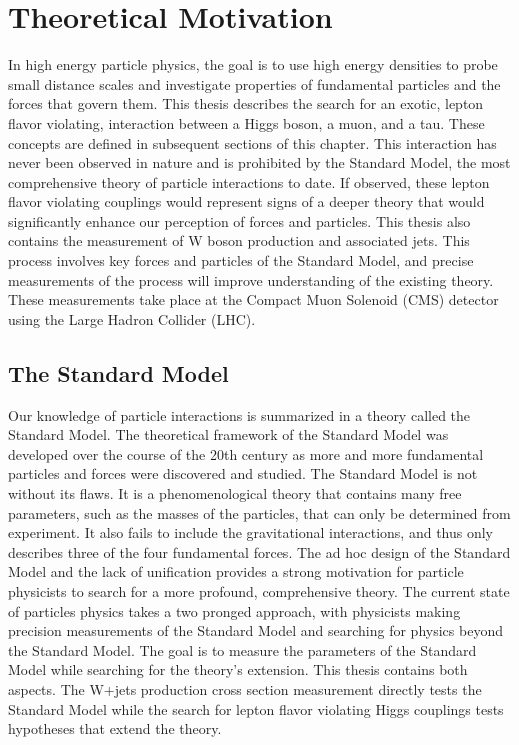 \documentclass[oneside, letterpaper, oldfontcommands]{memoir}
\begin{document}
\chapter{Theoretical Motivation}\label{theory}
\qquad In high energy particle physics, the goal is to use high energy densities to probe small distance scales and investigate properties of fundamental particles and the forces that govern them. This thesis describes the search for an exotic, lepton flavor violating, interaction between a Higgs boson, a muon, and a tau. These concepts are defined in subsequent sections of this chapter. This interaction has never been observed in nature and is prohibited by the Standard Model, the most comprehensive theory of particle interactions to date. If observed, these lepton flavor violating couplings would represent signs of a deeper theory that would significantly enhance our perception of forces and particles. This thesis also contains the measurement of W boson production and associated jets. This process involves key forces and particles of the Standard Model, and precise measurements of the process will improve understanding of the existing theory. These measurements take place at the Compact Muon Solenoid (CMS) detector using the Large Hadron Collider (LHC). 

\section{The Standard Model}\label{sm}

\qquad Our knowledge of particle interactions is summarized in a theory called the Standard Model. The theoretical framework of the Standard Model was developed over the course of the 20th century as more and more fundamental particles and forces were discovered and studied. The Standard Model is not without its flaws. It is a phenomenological theory that contains many free parameters, such as the masses of the particles, that can only be determined from experiment. It also fails to include the gravitational interactions, and thus only describes three of the four fundamental forces. The ad hoc design of the Standard Model and the lack of unification provides a strong motivation for particle physicists to search for a more profound, comprehensive theory. The current state of particles physics takes a two pronged approach, with physicists making precision measurements of the Standard Model and searching for physics beyond the Standard Model. The goal is to measure the parameters of the Standard Model while searching for the theory's extension. This thesis contains both aspects. The W+jets production cross section measurement directly tests the Standard Model while the search for lepton flavor violating Higgs couplings tests hypotheses that extend the theory.
\end{document}
